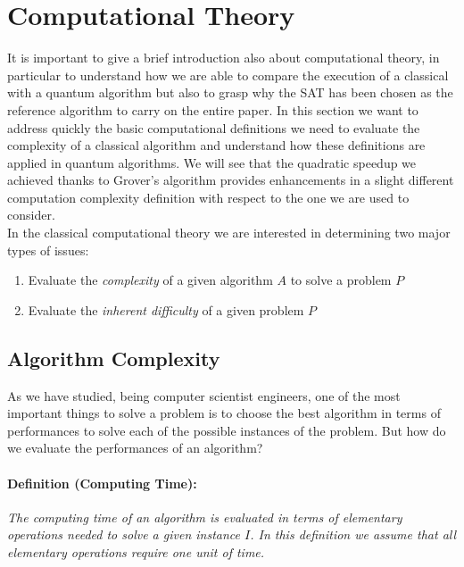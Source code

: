 \documentclass[english]{article}
\begin{document}
	\section{Computational Theory}
	\label{sec:computationalTheory}
		It is important to give a brief introduction also about computational theory, in particular to understand how we are able to compare the execution of a classical with a quantum algorithm but also to grasp why the SAT has been chosen as the reference algorithm to carry on the entire paper. In this section we want to address quickly the basic computational definitions we need to evaluate the complexity of a classical algorithm and understand how these definitions are applied in quantum algorithms. We will see that the quadratic speedup we achieved thanks to Grover's algorithm provides enhancements in a slight different computation complexity definition with respect to the one we are used to consider. \\
		
		In the classical computational theory we are interested in determining two major types of issues:
		
		\begin{enumerate}
			\item Evaluate the \emph{complexity} of a given algorithm $A$ to solve a problem $P$
			
			\item Evaluate the \emph{inherent difficulty} of a given problem $P$
		\end{enumerate}
	
		\subsection{Algorithm Complexity}
		\label{sec:algorithmComplexity}
			As we have studied, being computer scientist engineers, one of the most important things to solve a problem is to choose the best algorithm in terms of performances to solve each of the possible instances of the problem. But how do we evaluate the performances of an algorithm?
			
			\paragraph{Definition (Computing Time):} \emph{The computing time of an algorithm is evaluated in terms of elementary operations needed to solve a given instance $I$. In this definition we assume that all elementary operations require one unit of time.} \\
			
\end{document}

